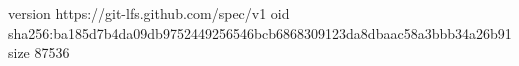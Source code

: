 version https://git-lfs.github.com/spec/v1
oid sha256:ba185d7b4da09db9752449256546bcb6868309123da8dbaac58a3bbb34a26b91
size 87536
